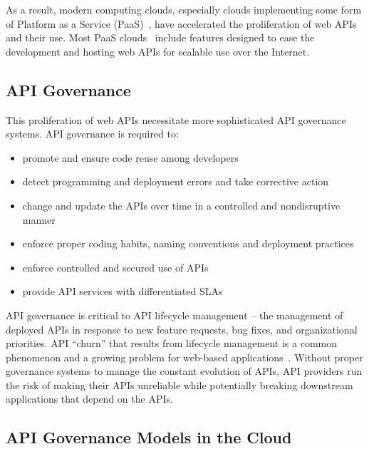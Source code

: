 As a result, modern computing clouds, especially clouds implementing some form
of Platform as a Service (PaaS)~\cite{XXXpassXXXX}, have accelerated the
proliferation of
web APIs and their use.  Most PaaS
clouds~\cite{XXXappscaleXXX,XXX,cloudfoundryXXX,XXXopenshiftXXX} include
features designed to
ease the development and hosting web APIs for scalable use over the Internet. 

\subsection{API Governance}
This proliferation of web APIs necessitate more sophisticated API 
governance systems. API governance is required to:
\begin{itemize}
\item promote and ensure code reuse among developers
\item detect programming and deployment errors and take corrective action
\item change and update the APIs over time in a controlled and nondisruptive manner
\item enforce proper coding habits, naming conventions and deployment practices
\item enforce controlled and secured use of APIs
\item provide API services with differentiated SLAs
\end{itemize}


API governance is critical to API lifecycle
management --  the management of deployed APIs in response to new feature
requests, bug fixes, and organizational priorities. 
API ``churn'' that results from lifecycle management
is a common phenomenon and a growing
problem for web-based applications~\cite{XXX}.
Without proper governance systems to manage the constant evolution of APIs,
API providers run the risk of making their APIs unreliable while potentially
breaking downstream applications that depend on the APIs.

\subsection{API Governance Models in the Cloud}

